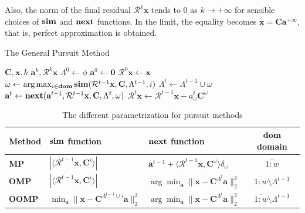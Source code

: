 \documentclass[12pt,a4paper,oneside,english]{UPBThesis}
\newcommand{\hcrange}[2]{\overline{{#1}\colon\!\!{#2}}}
\begin{document}
Also, the norm of the final residual $\mathcal{R}^k\textbf{x}$ tends to $0$ as $k \rightarrow +\infty$ for sensible choices of $\text{\textbf{sim}}$ and $\text{\textbf{next}}$ functions. In the limit, the equality becomes $\textbf{x} = \textbf{C}\textbf{a}^{+\infty}$, that is, perfect approximation is obtained.

\begin{algorithm}
\caption{The General Pursuit Method}
\label{algo:GeneralPursuitMethod}
\begin{algorithmic}
\Require $\textbf{C},\textbf{x},k$
\Ensure $\textbf{a}^k,\mathcal{R}^k\textbf{x}$
\State $\Lambda^0 \gets \phi$
\State $\textbf{a}^0 \gets \textbf{0}$
\State $\mathcal{R}^0\textbf{x} \gets \textbf{x}$
\For {$t = \hcrange{1}{k}$}
\State $\omega \gets \arg \max_{i \in \textbf{dom}} \text{\textbf{sim}}(\mathcal{R}^{t-1}\textbf{x},\textbf{C},\Lambda^{t-1},i)$
\State $\Lambda^t \gets \Lambda^{t-1} \cup \omega$
\State $\textbf{a}^t \gets \text{\textbf{next}}(\textbf{a}^{t-1},\mathcal{R}^{t-1}\textbf{x},\textbf{C},\Lambda^t,\omega)$
\State $\mathcal{R}^t\textbf{x} \gets \mathcal{R}^{t-1}\textbf{x} - a_\omega^t\textbf{C}^\omega$
\EndFor
\end{algorithmic}
\end{algorithm}

\renewcommand{\arraystretch}{1.5}
\begin{table}
  \caption{The different parametrization for pursuit methods}
  \label{table:PursuitParametrization}
  \begin{tabularx}{\textwidth}{|l|>{\centering}X|>{\centering}X|c|}
       \hline
        Method & $\text{\textbf{sim}}$ function & $\text{\textbf{next}}$ function & $\text{\textbf{dom}}$ domain\\ \hline \hline
        \textbf{MP} & $\left| \langle \mathcal{R}^{t-1}\textbf{x} , \textbf{C}^i \rangle \right|$ & $\textbf{a}^{t-1} + \langle \mathcal{R}^{t-1}\textbf{x} , \textbf{C}^\omega \rangle \delta_\omega$ & $\hcrange{1}{w}$ \\  \hline
        \textbf{OMP} & $\left| \langle \mathcal{R}^{t-1}\textbf{x} , \textbf{C}^i \rangle \right|$ & $\arg\min_{\textbf{a}} {\| \textbf{x} - \textbf{C}^{\Lambda^t}\textbf{a} \|_2^2}$ & $\hcrange{1}{w} \setminus \Lambda^{t-1}$ \\ \hline
        \textbf{OOMP} & $\min_{\textbf{a}} {\| \textbf{x} - \textbf{C}^{\Lambda^{t-1} \cup i}\textbf{a} \|_2^2}$ & $\arg\min_{\textbf{a}} {\| \textbf{x} - \textbf{C}^{\Lambda^t}\textbf{a} \|_2^2}$ & $\hcrange{1}{w} \setminus \Lambda^{t-1}$ \\
       \hline
    \end{tabularx}
\end{table}
\renewcommand{\arraystretch}{1.0}
\end{document}
